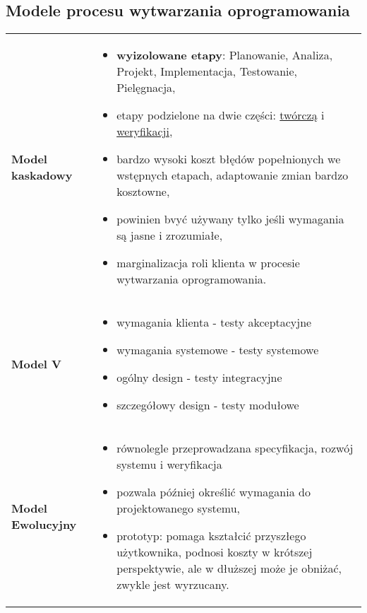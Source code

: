 \documentclass[a4paper]{article}
\begin{document}
    \subsection{Modele procesu wytwarzania oprogramowania}
    \begin{table}[H]
        \begin{center}
            \begin{tabular}{ p{4cm} p{11cm}  }

                \textbf{Model kaskadowy}
                &
                \begin{itemize}
                    \item \textbf{wyizolowane etapy}: Planowanie, Analiza, Projekt, Implementacja, Testowanie, Pielęgnacja,
                    \item etapy podzielone na dwie części: \underline{twórczą} i \underline{weryfikacji},
                    \item bardzo wysoki koszt błędów
                    popełnionych we wstępnych etapach, adaptowanie zmian bardzo kosztowne,
                    \item powinien bvyć używany tylko jeśli wymagania są jasne i zrozumiałe,
                    \item marginalizacja roli klienta w procesie wytwarzania oprogramowania.
                \end{itemize}
                \\

                \cmidrule(r){1-1}\cmidrule(l){2-2}

                \textbf{Model V}
                &
                \begin{itemize}
                    \item wymagania klienta - testy akceptacyjne
                    \item wymagania systemowe - testy systemowe
                    \item ogólny design - testy integracyjne
                    \item szczegółowy design - testy modułowe
                \end{itemize}
                \\

                \cmidrule(r){1-1}\cmidrule(l){2-2}

                \textbf{Model Ewolucyjny}
                &
                \begin{itemize}
                    \item równolegle przeprowadzana specyfikacja, rozwój systemu i weryfikacja
                    \item pozwala później określić wymagania do projektowanego systemu,
                    \item prototyp: pomaga kształcić przyszłego użytkownika, podnosi koszty
                    w krótszej perspektywie, ale w dłuższej może je obniżać, zwykle jest wyrzucany.
                \end{itemize}
                \\


\end{tabular}
\end{center}
\end{table}
\end{document}
